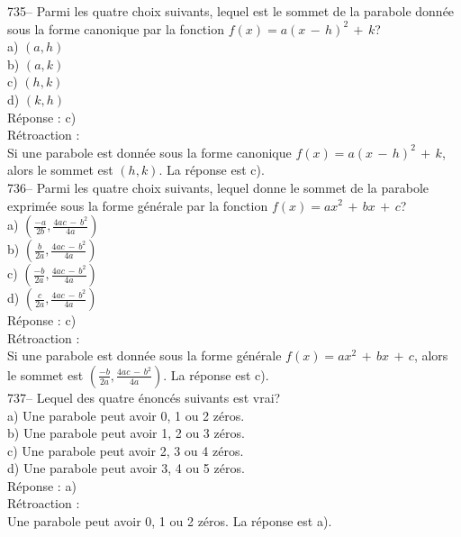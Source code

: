 ﻿\documentclass[letterpaper, 12pt]{article}
\begin{document}
735-- Parmi les quatre choix suivants, lequel est le sommet de la parabole
donn\'ee sous la forme canonique par la fonction
$f(x)=a(x\,-\,h)^{2}\,+\,k$?\\
a) $(a,h)$\\
b) $(a,k)$\\
c) $(h,k)$\\
d) $(k,h)$\\

R\'eponse : c)\\

R\'etroaction : \\
Si une parabole est donn\'ee sous la forme canonique
$f(x)=a(x\,-\,h)^{2}\,+\,k$, alors le sommet est $(h,k)$.  La r\'eponse est
c).\\

736-- Parmi les quatre choix suivants, lequel donne le sommet de la parabole
exprim\'ee sous la forme g\'en\'erale par la fonction
$f(x)=ax^{2}\,+\,bx\,+\,c$?\\
a) $(\frac{-a}{2b},\frac{4ac\,-\,b^{2}}{4a})$\\[2mm]
b) $(\frac{b}{2a},\frac{4ac\,-\,b^{2}}{4a})$\\[2mm]
c) $(\frac{-b}{2a},\frac{4ac\,-\,b^{2}}{4a})$\\[2mm]
d) $(\frac{c}{2a},\frac{4ac\,-\,b^{2}}{4a})$\\

R\'eponse : c)\\

R\'etroaction : \\
Si une parabole est donn\'ee sous la forme g\'en\'erale
$f(x)=ax^{2}\,+\,bx\,+\,c$, alors le sommet est
$(\frac{-b}{2a},\frac{4ac\,-\,b^{2}}{4a})$.  La r\'eponse est c).\\

737-- Lequel des quatre \'enonc\'es suivants est vrai?\\
a) Une parabole peut avoir 0, 1 ou 2 z\'eros.\\
b) Une parabole peut avoir 1, 2 ou 3 z\'eros.\\
c) Une parabole peut avoir 2, 3 ou 4 z\'eros.\\
d) Une parabole peut avoir 3, 4 ou 5 z\'eros.\\

R\'eponse : a)\\

R\'etroaction : \\
Une parabole peut avoir 0, 1 ou 2 z\'eros.  La r\'eponse est a).\\
\end{document}
